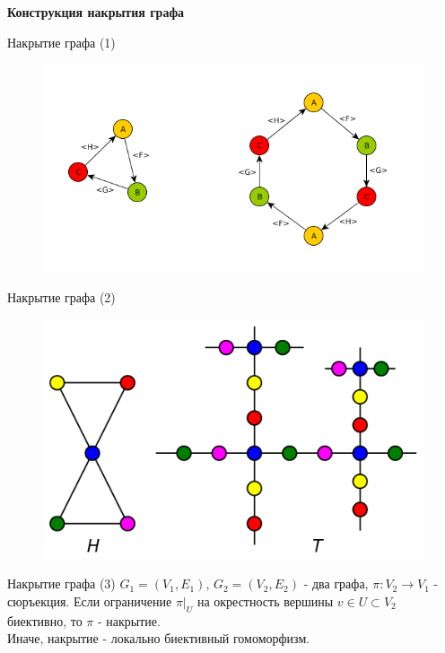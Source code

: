 \documentclass{beamer}
\begin{document}
\begin{frame}{}
\begin{center}
	\textbf{Конструкция накрытия графа}
\end{center}
\end{frame}

\begin{frame}{Накрытие графа (1)}
\begin{figure}[H]
\includegraphics[scale=0.5]{cover1.png} 
\end{figure}
\end{frame}

\begin{frame}{Накрытие графа (2)}
\begin{figure}[H]
\includegraphics[scale=0.5]{universal_cover.png} 
\end{figure}
\end{frame}

\begin{frame}{Накрытие графа (3)}
$G_1 = (V_1, E_1)$, $G_2 = (V_2, E_2)$ - два графа, $\pi: V_2 \to V_1$ - сюръекция. Если ограничение $\pi \vert_U$ на окрестность вершины $v \in U \subset V_2$ биективно, то $\pi$ - накрытие.\\
\bigskip
Иначе, накрытие - локально биективный гомоморфизм.
\end{frame}
\end{document}
